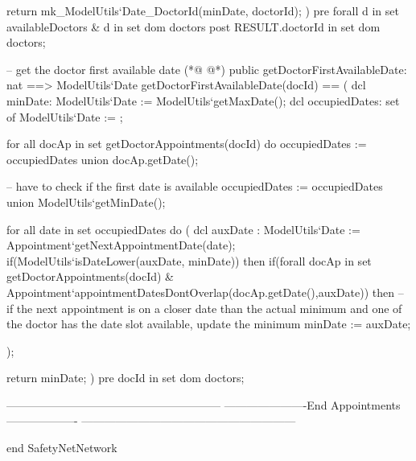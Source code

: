 \begin{vdmpp}[breaklines=true]
   return mk_ModelUtils`Date_DoctorId(minDate, doctorId);
  )
  pre forall d in set availableDoctors & d in set dom doctors
  post RESULT.doctorId in set dom doctors;
  
  -- get the doctor first available date
(*@
\label{getDoctorFirstAvailableDate:393}
@*)
  public getDoctorFirstAvailableDate: nat ==> ModelUtils`Date   
   getDoctorFirstAvailableDate(docId) == (
   dcl minDate: ModelUtils`Date := ModelUtils`getMaxDate(); 
   dcl occupiedDates: set of ModelUtils`Date := {};
   
  
   for all docAp in set getDoctorAppointments(docId) do
    occupiedDates := occupiedDates union {docAp.getDate()};
   
   
   -- have to check if the first date is available
   occupiedDates := occupiedDates union {ModelUtils`getMinDate()};
   
   for all date in set occupiedDates do
   (
    dcl auxDate : ModelUtils`Date := Appointment`getNextAppointmentDate(date);
    if(ModelUtils`isDateLower(auxDate, minDate)) then  
       if(forall docAp in set getDoctorAppointments(docId) &  Appointment`appointmentDatesDontOverlap(docAp.getDate(),auxDate)) then -- if the next appointment is on a closer date than the actual minimum and one of the doctor has the date slot available, update the minimum
        minDate := auxDate;
       
   );
   
   return minDate;
  )
  pre docId in set dom doctors;
 
  
  
   ---------------------------------------------------------
  ----------------------End Appointments-------------------
  ---------------------------------------------------------
  

end SafetyNetNetwork
\end{vdmpp}
\bigskip

